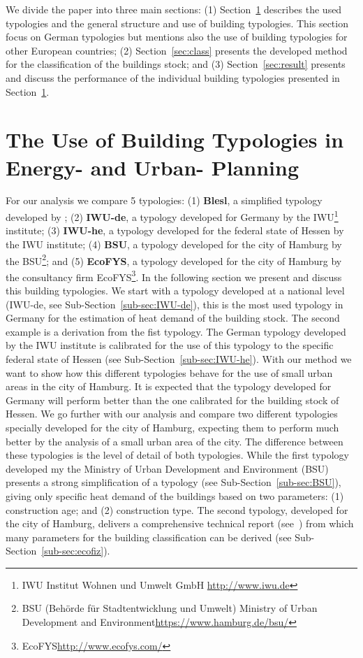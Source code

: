 \documentclass[authoryear,preprint,review,12pt]{elsarticle}
\begin{document}
\begin{linenumbers}
We divide the paper into three main sections: (1) Section~\ref{sec:Btype}
describes the used typologies and the general structure and use of building
typologies. This section focus on German typologies but mentions also the use
of building typologies for other European countries; (2)
Section~\ref{sec:class} presents the developed method for the classification of
the buildings stock; and (3) Section~\ref{sec:result} presents and discuss the
performance of the individual building typologies presented in
Section~\ref{sec:Btype}.\\

\section{The Use of Building Typologies in Energy- and Urban-
Planning}\label{sec:Btype}

For our analysis we compare 5 typologies:
(1) \textbf{Blesl}, a simplified typology developed by
\citeauthor{Blesl.2007};
(2) \textbf{IWU-de}, a typology developed for Germany by the IWU\footnote{IWU
    Institut Wohnen und Umwelt GmbH \url{http://www.iwu.de}} institute;
(3) \textbf{IWU-he}, a typology developed for the federal state of Hessen by
the IWU institute;
(4) \textbf{BSU}, a typology developed for the city of Hamburg by the
BSU\footnote{BSU (Behörde für Stadtentwicklung und Umwelt) Ministry of Urban
    Development and Environment\url{https://www.hamburg.de/bsu/}}; and
(5) \textbf{EcoFYS}, a typology developed for the city of Hamburg by the
consultancy firm EcoFYS\footnote{EcoFYS\url{http://www.ecofys.com/}}.
In the following section we present and discuss this building typologies. We
start with a typology developed at a national level (IWU-de, see
Sub-Section~\ref{sub-sec:IWU-de}), this is the most used typology in Germany
for the estimation of heat demand of the building stock.  The second example is
a derivation from the fist typology.  The German typology developed by the IWU
institute is calibrated for the use of this typology to the specific federal
state of Hessen (see Sub-Section~\ref{sub-sec:IWU-he}).  With our method we
want to show how this different typologies behave for the use of small urban
areas in the city of Hamburg.  It is expected that the typology developed for
Germany will perform better than the one calibrated for the building stock of
Hessen.  We go further with our analysis and compare two different typologies
specially developed for the city of Hamburg, expecting them to perform much
better by the analysis of a small urban area of the city.  The difference
between these typologies is the level of detail of both typologies.  While the
first typology developed my the Ministry of Urban Development and Environment
(BSU) presents a strong simplification of a typology (see
Sub-Section~\ref{sub-sec:BSU}), giving only specific heat demand of the
buildings based on two parameters:
(1) construction age; and
(2) construction type.
The second typology, developed for the city of Hamburg, delivers a
comprehensive technical report (see~\cite{Hermelink.2011}) from which many
parameters for the building classification can be derived (see
Sub-Section~\ref{sub-sec:ecofiz}).\\


\end{linenumbers}
\end{document}

